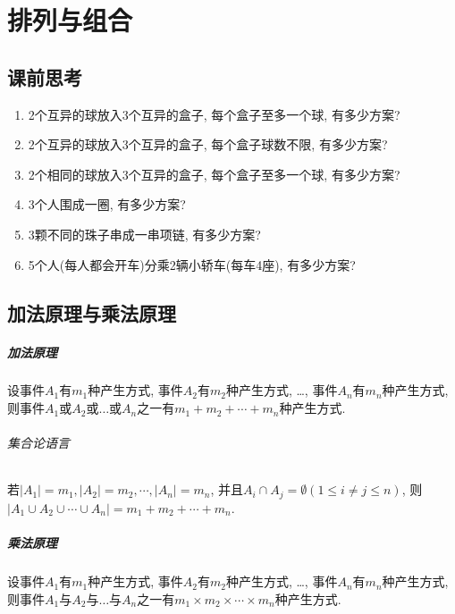\chapter{排列与组合}

\section*{课前思考}

    \begin{enumerate}
        \item 2个互异的球放入3个互异的盒子, 每个盒子至多一个球, 有多少方案? 
        \item 2个互异的球放入3个互异的盒子, 每个盒子球数不限, 有多少方案? 
        \item 2个相同的球放入3个互异的盒子, 每个盒子至多一个球, 有多少方案? 
        \item 3个人围成一圈, 有多少方案? 
        \item 3颗不同的珠子串成一串项链, 有多少方案? 
        \item 5个人(每人都会开车)分乘2辆小轿车(每车4座), 有多少方案? 
    \end{enumerate}

\section{加法原理与乘法原理}

    \paragraph{加法原理}
        
        设事件$A_1$有$m_1$种产生方式, 事件$A_2$有$m_2$种产生方式, \ldots, 事件$A_n$有$m_n$种产生方式, 则事件$A_1$或$A_2$或$\ldots$或$A_n$之一有$m_1+m_2+\cdots+m_n$种产生方式.

        \subparagraph{集合论语言}

            若$|A_1|=m_1, |A_2|=m_2, \cdots, |A_n|=m_n$, 并且$A_i\cap A_j=\emptyset(1\leqslant i\neq j\leqslant n)$, 则$|A_1\cup A_2\cup\cdots\cup A_n|=m_1+m_2+\cdots+m_n$.

    \paragraph{乘法原理}

        设事件$A_1$有$m_1$种产生方式, 事件$A_2$有$m_2$种产生方式, \ldots, 事件$A_n$有$m_n$种产生方式, 则事件$A_1$与$A_2$与$\ldots$与$A_n$之一有$m_1\times m_2\times \cdots\times m_n$种产生方式.

